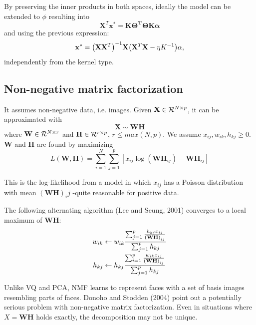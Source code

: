 \documentclass[12pt, letterpaper]{article}
\theoremstyle{definition}
\newcommand{\X}{\mathrm{\mathbf{X}}}
\newcommand{\x}{\mathbf{x}}
\DeclarePairedDelimiter\autobracket{(}{)}
\newcommand{\br}[1]{\autobracket*{#1}}
\begin{document}
By preserving the inner products in both spaces, ideally the model can be extended to $\phi$ resulting into 
\begin{equation}
\X^T\x^* = \mathbf{K\Theta^T\Theta K\alpha}
\end{equation}
and using the previous expression:
\begin{equation}
\x^* = \br{\X\X^T}^{-1}\X\br{\X^T\X -\eta K^{-1}}\alpha,
\end{equation}
independently from the kernel type.


\subsection{Non-negative matrix factorization}
It assumes non-negative data, i.e. images. Given $\X \in \CMcal{R}^{N\times p}$, it can be approximated with
\begin{equation}
\X \sim \mathbf{W}\mathbf{H}
\end{equation}
where $\mathbf{W} \in \CMcal{R}^{N\times r}$ and $\mathbf{H} \in \CMcal{R}^{r\times p}$, $r\le max(N,p)$. We assume $x_{ij}, w_{ik}, h_{kj}\ge 0$. $\mathbf{W}$ and $\mathbf{H}$ are found by maximizing
\begin{equation}
L(\mathbf{W}, \mathbf{H}) = \sum_{i=1}^N\sum_{j=1}^p \left[ x_{ij}\log(\mathbf{WH}_{ij}) - \mathbf{WH}_{ij} \right]
\end{equation}

This is the log-likelihood from a model in which $x_{ij}$ has a Poisson distribution with mean $(\mathbf{WH})_ij$ -quite reasonable for positive data.

The following alternating algorithm (Lee and Seung, 2001) converges to a local maximum of $\mathbf{WH}$:
\begin{equation}
\begin{aligned}
w_{ik} &\leftarrow w_{ik}\frac{\sum_{j=1}^p \frac{h_{kj} x_{ij}}{\br{\mathbf{WH}}_{ij}}}{\sum_{j=1}^p h_{kj}}\\
h_{kj} &\leftarrow  h_{kj}\frac{\sum_{i=1}^p  \frac{w_{ik}x_{ij}}{\br{\mathbf{WH}}_{ij}}} {\sum_{j=1}^p h_{kj}}
\end{aligned}
\end{equation}

Unlike VQ and PCA, NMF learns to represent faces with a set of basis images resembling parts of faces.
Donoho and Stodden (2004) point out a potentially serious problem with non-negative matrix factorization. Even in situations where $X = \mathbf{WH}$ holds exactly, the decomposition may not be unique.
\end{document}
